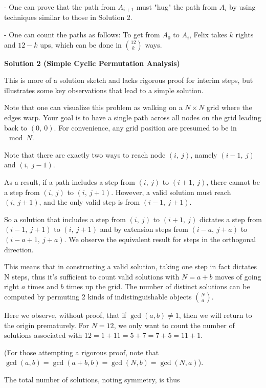 \begin{enumerate}
{{ - One can prove that the path from $A_{i+1}$ must "hug" the path from $A_i$ by using techniques similar to those in Solution 2.

 - One can count the paths as follows:  To get from $A_0$ to $A_i$, Felix takes $k$ rights and $12-k$ ups, which can be done in  ${12\choose k}$ ways.

 



\textbf{Solution 2 (Simple Cyclic Permutation Analysis)}

This is more of a solution sketch and lacks rigorous proof for interim steps, but illustrates some key observations that lead to a simple solution.

 Note that one can visualize this problem as walking on a $N \times N$ grid where the edges warp. Your goal is to have a single path across all nodes on the grid leading back to $(0,\ 0)$. For convenience, any grid position are presumed to be in $\mod N$.

 Note that there are exactly two ways to reach node $(i,\ j)$, namely $(i - 1,\ j)$ and $(i,\ j - 1)$. 

 As a result, if a path includes a step from $(i,\ j)$ to $(i + 1,\ j)$, there cannot be a step from $(i,\ j)$ to $(i,\ j + 1)$. However, a valid solution must reach $(i,\ j + 1)$, and the only valid step is from $(i - 1,\ j + 1)$.

 So a solution that includes a step from $(i,\ j)$ to $(i + 1,\ j)$ dictates a step from $(i - 1,\ j + 1)$ to $(i,\ j + 1)$ and by extension steps from $(i - a,\ j + a)$ to $(i - a + 1,\ j + a)$. We observe the equivalent result for steps in the orthogonal direction.

 This means that in constructing a valid solution, taking one step in fact dictates N steps, thus it's sufficient to count valid solutions with $N = a + b$ moves of going right $a$ times and $b$ times up the grid. The number of distinct solutions can be computed by permuting 2 kinds of indistinguishable objects $\binom{N}{a}$.

 Here we observe, without proof, that if $\gcd(a, b) \neq 1$, then we will return to the origin prematurely. For $N = 12$, we only want to count the number of solutions associated with $12 = 1 + 11 = 5 + 7 = 7 + 5 = 11 + 1$.

 (For those attempting a rigorous proof, note that $\gcd(a, b) = \gcd(a + b, b) = \gcd(N, b) = \gcd(N, a)$).

 The total number of solutions, noting symmetry, is thus

}}
\end{enumerate}
